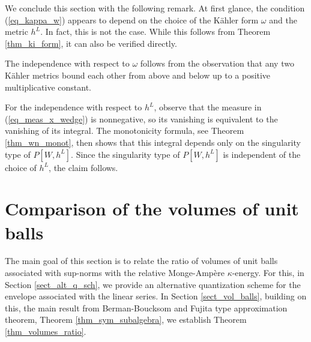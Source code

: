 \documentclass[12pt]{article}
\numberwithin{equation}{section}
\theoremstyle{theorem}
\theoremstyle{definition}
\theoremstyle{remark}
\begin{document}
	We conclude this section with the following remark. 
	At first glance, the condition (\ref{eq_kappa_w}) appears to depend on the choice of the Kähler form $\omega$ and the metric $h^L$. 
	In fact, this is not the case. 
	While this follows from Theorem \ref{thm_ki_form}, it can also be verified directly.
	\par 
	The independence with respect to $\omega$ follows from the observation that any two Kähler metrics bound each other from above and below up to a positive multiplicative constant.
	\par
	For the independence with respect to $h^L$, observe that the measure in (\ref{eq_meas_x_wedge}) is nonnegative, so its vanishing is equivalent to the vanishing of its integral. 
	The monotonicity formula, see Theorem \ref{thm_wn_monot}, then shows that this integral depends only on the singularity type of $P[W, h^L]$. 
	Since the singularity type of $P[W, h^L]$ is independent of the choice of $h^L$, the claim follows.
	
		
	\section{Comparison of the volumes of unit balls}\label{sect_vol_balls_compar}
	The main goal of this section is to relate the ratio of volumes of unit balls associated with sup-norms with the relative Monge-Ampère $\kappa$-energy.
	For this, in Section \ref{sect_alt_q_sch}, we provide an alternative quantization scheme for the envelope associated with the linear series.
	In Section \ref{sect_vol_balls}, building on this, the main result from Berman-Boucksom \cite{BermanBouckBalls} and Fujita type approximation theorem, Theorem \ref{thm_sym_subalgebra}, we establish Theorem \ref{thm_volumes_ratio}.
	
\end{document}
